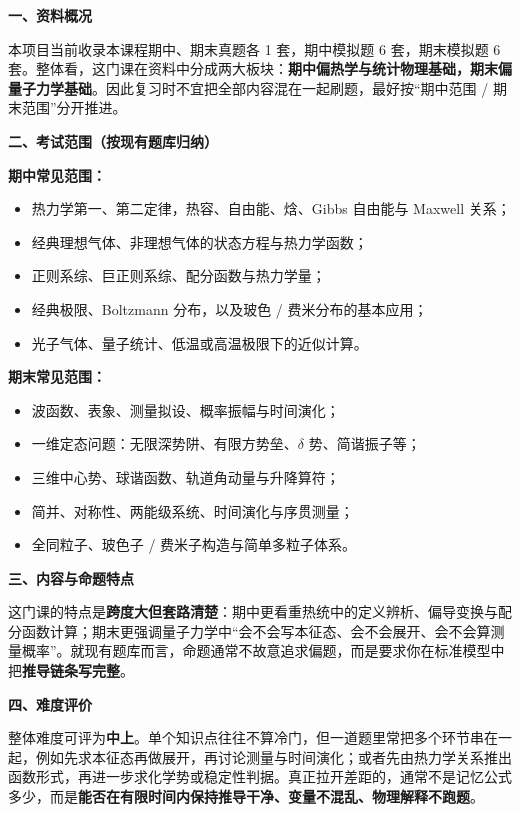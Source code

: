 ﻿

\textbf{一、资料概况}

本项目当前收录本课程期中、期末真题各 1 套，期中模拟题 6 套，期末模拟题 6 套。整体看，这门课在资料中分成两大板块：\textbf{期中偏热学与统计物理基础，期末偏量子力学基础}。因此复习时不宜把全部内容混在一起刷题，最好按“期中范围 / 期末范围”分开推进。

\textbf{二、考试范围（按现有题库归纳）}

\textbf{期中常见范围：}
\begin{itemize}[leftmargin=2em,itemsep=0.2em,topsep=0.2em]
  \item 热力学第一、第二定律，热容、自由能、焓、Gibbs 自由能与 Maxwell 关系；
  \item 经典理想气体、非理想气体的状态方程与热力学函数；
  \item 正则系综、巨正则系综、配分函数与热力学量；
  \item 经典极限、Boltzmann 分布，以及玻色 / 费米分布的基本应用；
  \item 光子气体、量子统计、低温或高温极限下的近似计算。
\end{itemize}

\textbf{期末常见范围：}
\begin{itemize}[leftmargin=2em,itemsep=0.2em,topsep=0.2em]
  \item 波函数、表象、测量拟设、概率振幅与时间演化；
  \item 一维定态问题：无限深势阱、有限方势垒、$\delta$ 势、简谐振子等；
  \item 三维中心势、球谐函数、轨道角动量与升降算符；
  \item 简并、对称性、两能级系统、时间演化与序贯测量；
  \item 全同粒子、玻色子 / 费米子构造与简单多粒子体系。
\end{itemize}

\textbf{三、内容与命题特点}

这门课的特点是\textbf{跨度大但套路清楚}：期中更看重热统中的定义辨析、偏导变换与配分函数计算；期末更强调量子力学中“会不会写本征态、会不会展开、会不会算测量概率”。就现有题库而言，命题通常不故意追求偏题，而是要求你在标准模型中把\textbf{推导链条写完整}。

\textbf{四、难度评价}

整体难度可评为\textbf{中上}。单个知识点往往不算冷门，但一道题里常把多个环节串在一起，例如先求本征态再做展开，再讨论测量与时间演化；或者先由热力学关系推出函数形式，再进一步求化学势或稳定性判据。真正拉开差距的，通常不是记忆公式多少，而是\textbf{能否在有限时间内保持推导干净、变量不混乱、物理解释不跑题}。

